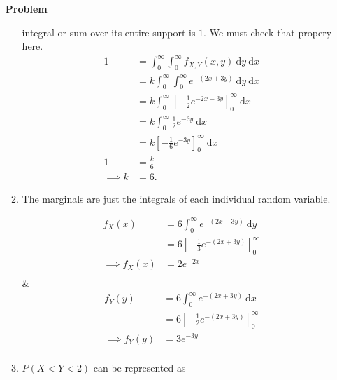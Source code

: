 \documentclass[12pt]{article}
\newenvironment{Ex}{\textbf{Problem}\vspace{.75em}\\}{}
\newcommand{\dd}[1]{\:\mathrm{d}{#1}}
\begin{document}
\begin{enumerate}
\begin{Ex}
\begin{solution}
\begin{enumerate}
        integral or sum over its entire support is $1$. We must
        check that propery here.
        \begin{equation}
          \label{eq:6a-sol}
          \begin{aligned}
            1 &= \int_0^\infty \int_0^\infty f_{X,Y}(x,y) \dd{y}
            \dd{x} \\
            &= k \int_0^\infty \int_0^\infty e^{-(2x+3y)} \dd{y}
            \dd{x} \\
            &= k \int_0^\infty
            \left[-\frac{1}{2}e^{-2x-3y}\right]_0^\infty
            \dd{x} \\
            &= k \int_0^\infty \frac{1}{2}e^{-3y} \dd{x} \\
            &= k \left[-\frac{1}{6}e^{-3y}\right]_0^\infty \dd{x} \\
            1 &= \frac{k}{6} \\
            \implies k &= 6.
          \end{aligned}
        \end{equation}
      \item The marginals are just the integrals of each individual
        random variable.
        \begin{multicols}{2}
          \begin{equation}
            \label{eq:5b-marginal-x}
            \begin{aligned}
              f_X(x) &= 6\int_0^\infty e^{-(2x+3y)} \dd{y} \\
              &= 6\left[-\frac{1}{3}e^{-(2x+3y)}\right]_0^\infty \\
              \implies f_X(x) &= 2e^{-2x} \\
            \end{aligned}
          \end{equation} &
          \begin{equation}
            \label{eq:5b-marginal-y}
            \begin{aligned}
              f_Y(y) &= 6\int_0^\infty e^{-(2x+3y)} \dd{x} \\
              &= 6\left[-\frac{1}{2}e^{-(2x+3y)}\right]_0^\infty \\
              \implies f_Y(y) &= 3e^{-3y} \\
            \end{aligned}
          \end{equation}
        \end{multicols}
      \item $P(X<Y<2)$ can be represented as

\end{enumerate}
\end{solution}
\end{Ex}
\end{enumerate}
\end{document}
